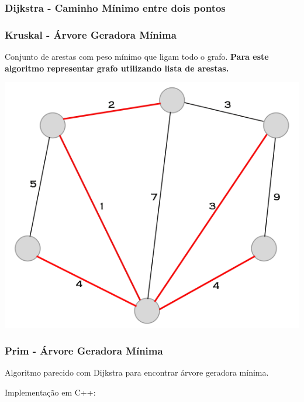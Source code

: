 \documentclass[a4paper,12pt]{article}
\begin{document}

\subsubsection{Dijkstra - Caminho Mínimo entre dois pontos}


\subsubsection{Kruskal - Árvore Geradora Mínima}

Conjunto de arestas com peso mínimo que ligam todo o grafo. \textbf{Para este algoritmo representar grafo utilizando lista de arestas.}

\begin{center}
  \includegraphics[width=\linewidth/2]{figures/grafos/agm.png}
\end{center}

\subsubsection{Prim - Árvore Geradora Mínima}

Algoritmo parecido com Dijkstra para encontrar árvore geradora mínima.

\noindent Implementação em C++:
\end{document}
